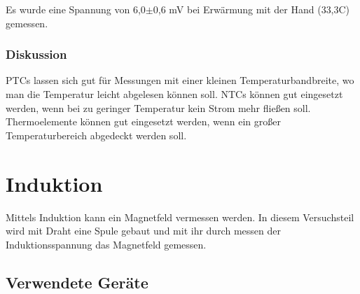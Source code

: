 \documentclass[12pt,a4paper]{article}
\begin{document}
Es wurde eine Spannung von 6,0$\pm$0,6 mV bei Erwärmung mit der Hand (33,3C) gemessen.

\subsubsection*{Diskussion}

PTCs lassen sich gut für Messungen mit einer kleinen Temperaturbandbreite, wo man die Temperatur leicht abgelesen können soll. NTCs können gut eingesetzt werden, wenn bei zu geringer Temperatur kein Strom mehr fließen soll. Thermoelemente können gut eingesetzt werden, wenn ein großer Temperaturbereich abgedeckt werden soll. 









\section{Induktion}

Mittels Induktion kann ein Magnetfeld vermessen werden. In diesem Versuchsteil wird mit Draht eine Spule gebaut und mit ihr durch messen der Induktionsspannung das Magnetfeld gemessen.

\subsection*{Verwendete Geräte}
\end{document}
